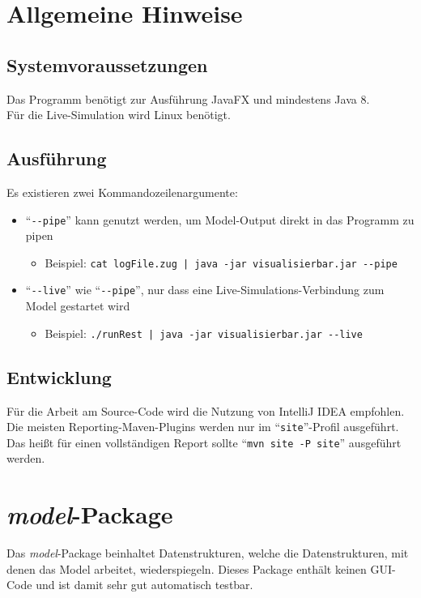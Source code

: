 \documentclass[accentcolor=tud0b,12pt,paper=a4]{tudreport}
\begin{document}
	 	
	\chapter{Allgemeine Hinweise}
	
	\section{Systemvoraussetzungen}
	Das Programm benötigt zur Ausführung JavaFX und mindestens Java 8.\\
	Für die Live-Simulation wird Linux benötigt.
	
	\section{Ausführung}
	Es existieren zwei Kommandozeilenargumente:
	\begin{itemize}
		\item "`\texttt{-{}-pipe}"' kann genutzt werden, um Model-Output direkt in das Programm zu pipen
		\begin{itemize}
			\item Beispiel: \texttt{cat logFile.zug | java -jar visualisierbar.jar -{}-pipe}
		\end{itemize}
		\item "`\texttt{-{}-live}"' wie "`\texttt{-{}-pipe}"', nur dass eine Live-Simulations-Verbindung zum Model gestartet wird
		\begin{itemize}
			\item Beispiel: \texttt{./runRest | java -jar visualisierbar.jar -{}-live}
		\end{itemize}
	\end{itemize}
	
	\section{Entwicklung}
	Für die Arbeit am Source-Code wird die Nutzung von IntelliJ IDEA empfohlen.\\
	Die meisten Reporting-Maven-Plugins werden nur im "`\texttt{site}"'-Profil ausgeführt. Das heißt für einen vollständigen Report sollte "`\texttt{mvn site -P site}"' ausgeführt werden.\\
	
	\chapter{\textit{model}-Package}
	Das \textit{model}-Package beinhaltet Datenstrukturen, welche die Datenstrukturen, mit denen das Model arbeitet, wiederspiegeln.
	Dieses Package enthält keinen GUI-Code und ist damit sehr gut automatisch testbar.
	
\end{document}
